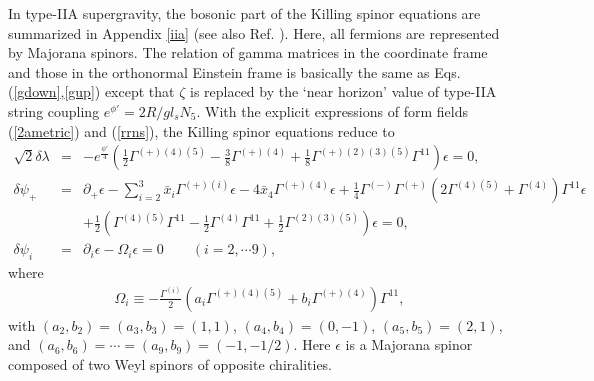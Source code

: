 \documentclass[a4paper,12pt]{article}
\begin{document}
In type-IIA supergravity, the bosonic part of the Killing spinor equations are summarized in Appendix \ref{iia} (see also Ref. \cite{giani,hassan}).
Here, all fermions are represented by Majorana spinors.
The relation of gamma matrices in the coordinate frame and those in the orthonormal Einstein frame is basically the same as Eqs. (\ref{gdown},\ref{gup}) except that $\zeta$ is replaced by the `near horizon' value of type-IIA string coupling $e^{\phi'}=2R/gl_sN_5$. With the explicit expressions of form fields (\ref{2ametric}) and (\ref{rrns}), the Killing spinor equations reduce to
\begin{eqnarray}\label{killing4}
\sqrt{2}\delta\lambda&=&-e^{\frac{\phi'}{4}}\left(\frac{1}{2}\Gamma^{(+)(4)(5)}-\frac{3}{8}\Gamma^{(+)(4)}+\frac{1}{8}\Gamma^{(+)(2)(3)(5)}\Gamma^{11}\right)\epsilon=0,\nonumber\\
\delta\psi_+&=&\partial_+\epsilon-\sum\limits_{i=2}^3 \bar{x}_i\Gamma^{(+)(i)}\epsilon-4\bar{x}_4\Gamma^{(+)(4)}\epsilon+\frac{1}{4}\Gamma^{(-)}\Gamma^{(+)}\left(2\Gamma^{(4)(5)}+\Gamma^{(4)}\right)\Gamma^{11}\epsilon\nonumber\\
&&+\frac{1}{2}\left(\Gamma^{(4)(5)}\Gamma^{11}-
\frac{1}{2}\Gamma^{(4)}\Gamma^{11}+\frac{1}{2}\Gamma^{(2)(3)(5)}\right)\epsilon=0,\nonumber\\
\delta\psi_i&=&\partial_i\epsilon-\Omega_i\epsilon=0 \qquad (i=2,\cdots 9),
\end{eqnarray}
where
\begin{eqnarray}\label{omega}
\Omega_i\equiv-\frac{\Gamma^{(i)}}{2}\left(a_i\Gamma^{(+)(4)(5)}+b_i\Gamma^{(+)(4)}\right)\Gamma^{11},
\end{eqnarray}
with $(a_2, b_2)=(a_3, b_3)=(1,1)$, $(a_4, b_4)=(0,-1)$, 
$(a_5, b_5)=(2,1)$, and $(a_6, b_6)=\cdots =(a_9, b_9)=(-1,-1/2)$. Here $\epsilon$ is a Majorana spinor composed of two Weyl spinors of opposite chiralities.
\end{document}
